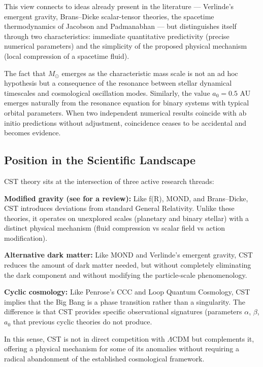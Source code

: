 \documentclass[10pt,a4paper]{article}
\begin{document}
This view connects to ideas already present in the literature ---
Verlinde's emergent gravity, Brans--Dicke scalar-tensor theories, the
spacetime thermodynamics \cite{Jacobson1995,Padmanabhan2010} of Jacobson and Padmanabhan \cite{Padmanabhan2010} --- but
distinguishes itself through two characteristics: immediate quantitative
predictivity (precise numerical parameters) and the simplicity of the
proposed physical mechanism (local compression of a spacetime fluid).

The fact that \(M_\odot\) emerges as the characteristic mass scale is
not an ad hoc hypothesis but a consequence of the resonance between
stellar dynamical timescales and cosmological oscillation modes.
Similarly, the value \(a_0 = 0.5\) AU emerges naturally from the
resonance equation for binary systems with typical orbital parameters.
When two independent numerical results coincide with ab initio
predictions without adjustment, coincidence ceases to be accidental and
becomes evidence.

\subsection{Position in the Scientific
Landscape}\label{position-in-the-scientific-landscape}

CST theory sits at the intersection of three active research threads:

\textbf{Modified gravity (see \cite{Clifton2012} for a review):} Like f(R), MOND, and Brans--Dicke, CST
introduces deviations from standard General Relativity. Unlike these
theories, it operates on unexplored scales (planetary and binary
stellar) with a distinct physical mechanism (fluid compression vs scalar
field vs action modification).

\textbf{Alternative dark matter:} Like MOND and Verlinde's emergent
gravity, CST reduces the amount of dark matter needed, but without
completely eliminating the dark component and without modifying the
particle-scale phenomenology.

\textbf{Cyclic cosmology:} Like Penrose's CCC \cite{Penrose2010} and Loop Quantum
Cosmology, CST implies that the Big Bang is a phase transition rather
than a singularity. The difference is that CST provides specific
observational signatures (parameters \(\alpha\), \(\beta\), \(a_0\)
that previous cyclic theories do not produce.

In this sense, CST is not in direct competition with \(\Lambda\)CDM but
complements it, offering a physical mechanism for some of its anomalies
without requiring a radical abandonment of the established cosmological
framework.
\end{document}
